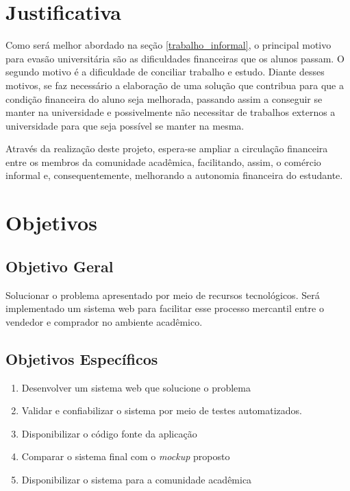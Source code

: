 \section{Justificativa}
\label{sec:justificativa}

Como será melhor abordado na seção \ref{trabalho_informal}, o principal motivo para evasão universitária são as dificuldades financeiras que os alunos passam. O segundo motivo é a dificuldade de conciliar trabalho e estudo. Diante desses motivos, se faz necessário a elaboração de uma solução que contribua para que a condição financeira do aluno seja melhorada, passando assim a conseguir se manter na universidade e possivelmente não necessitar de trabalhos externos a universidade para que seja possível se manter na mesma.

Através da realização deste projeto, espera-se ampliar a circulação financeira entre os membros da comunidade acadêmica, facilitando, assim, o comércio informal e, consequentemente, melhorando a autonomia financeira do estudante.

\section{Objetivos}

\subsection{Objetivo Geral}

Solucionar o problema apresentado por meio de recursos tecnológicos. Será implementado um sistema web para facilitar esse processo mercantil entre o vendedor e comprador no ambiente acadêmico.

\subsection{Objetivos Específicos}
\begin{enumerate}
    \item Desenvolver um sistema web que solucione o problema
    \item Validar e confiabilizar o sistema por meio de testes automatizados.
    \item Disponibilizar o código fonte da aplicação
    \item Comparar o sistema final com o \textit{mockup} proposto
    \item Disponibilizar o sistema para a comunidade acadêmica
\end{enumerate}


